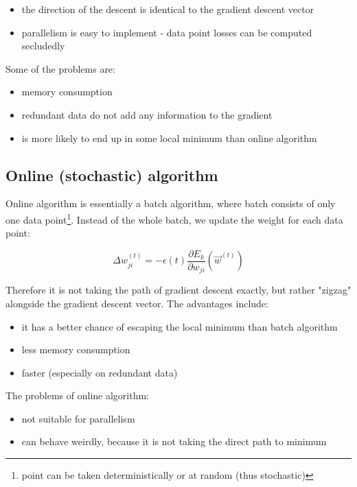 \begin{itemize}

\item the direction of the descent is identical to the gradient descent vector
\item parallelism is easy to implement - data point losses can be computed secludedly

\end{itemize}

\noindent
Some of the problems are:

\begin{itemize}

\item memory consumption
\item redundant data do not add any information to the gradient
\item is more likely to end up in some local minimum than online algorithm

\end{itemize}

\subsection*{Online (stochastic) algorithm}

Online algorithm is essentially a batch algorithm, where batch consists of only one data point\footnote{point can be taken deterministically or at random (thus stochastic)}. Instead of the whole batch, we update the weight for each data point:

$$ \Delta w_{ji}^{(t)} = - \epsilon(t) \frac{\partial E_k}{\partial w_{ji}}(\overrightarrow{w}^{(t)}) $$

\noindent
Therefore it is not taking the path of gradient descent exactly, but rather "zigzag" alongside the gradient descent vector. The advantages include:

\begin{itemize}

\item it has a better chance of escaping the local minimum than batch algorithm
\item less memory consumption
\item faster (especially on redundant data)

\end{itemize}

\noindent
The problems of online algorithm:

\begin{itemize}

\item not suitable for parallelism
\item can behave weirdly, because it is not taking the direct path to minimum

\end{itemize}

